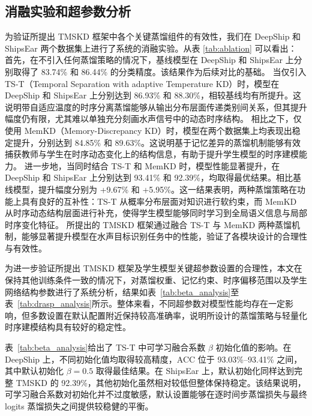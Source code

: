 \documentclass[a4paper, 12pt]{article}
\begin{document}
\subsection{消融实验和超参数分析}
为验证所提出 TMSKD 框架中各个关键蒸馏组件的有效性，我们在 DeepShip 和 ShipsEar 两个数据集上进行了系统的消融实验。从表 \ref{tab:ablation} 可以看出：
首先，在不引入任何蒸馏策略的情况下，基线模型在 DeepShip 和 ShipsEar 上分别取得了 83.74\% 和 86.44\% 的分类精度。该结果作为后续对比的基础。
当仅引入 TS-T（Temporal Separation with adaptive Temperature KD）时，模型在 DeepShip 和 ShipsEar 上分别达到 86.93\% 和 88.30\%，相较基线均有所提升。这说明带自适应温度的时序分离蒸馏能够从输出分布层面传递类别间关系，但其提升幅度仍有限，尤其难以单独充分刻画水声信号中的动态时序结构。
相比之下，仅使用 MemKD（Memory-Discrepancy KD）时，模型在两个数据集上均表现出稳定提升，分别达到 84.85\% 和 89.63\%。这说明基于记忆差异的蒸馏机制能够有效捕获教师与学生在时序动态变化上的结构信息，有助于提升学生模型的时序建模能力。
进一步地，当同时结合 TS-T 和 MemKD 时，模型性能显著提升，在 DeepShip 和 ShipsEar 上分别达到 93.41\% 和 92.39\%，均取得最优结果。相比基线模型，提升幅度分别为 +9.67\% 和 +5.95\%。这一结果表明，两种蒸馏策略在功能上具有良好的互补性：TS-T 从概率分布层面对知识进行软约束，而 MemKD 从时序动态结构层面进行补充，使得学生模型能够同时学习到全局语义信息与局部时序变化特征。
所提出的 TMSKD 框架通过融合 TS-T 与 MemKD 两种蒸馏机制，能够显著提升模型在水声目标识别任务中的性能，验证了各模块设计的合理性与有效性。


为进一步验证所提出 TMSKD 框架及学生模型关键超参数设置的合理性，本文在保持其他训练条件一致的情况下，对蒸馏权重、记忆约束、时序偏移范围以及学生网络结构参数进行了系统分析，结果如表~\ref{tab:beta_analysis}至表~\ref{tab:drasp_analysis}所示。整体来看，不同超参数对模型性能均存在一定影响，但多数设置在默认配置附近保持较高准确率，说明所设计的蒸馏策略与轻量化时序建模结构具有较好的稳定性。

表~\ref{tab:beta_analysis}给出了 TS-T 中可学习融合系数 $\beta$ 初始化值的影响。在 DeepShip 上，不同初始化值均取得较高精度，ACC 位于 93.03\%--93.41\% 之间，其中默认初始化 $\beta=0.5$ 取得最佳结果。在 ShipsEar 上，默认初始化同样达到完整 TMSKD 的 92.39\%，其他初始化虽然相对较低但整体保持稳定。该结果说明，可学习融合系数对初始化并不过度敏感，默认设置能够在逐时间步蒸馏损失与最终 logits 蒸馏损失之间提供较稳健的平衡。

\end{document}
